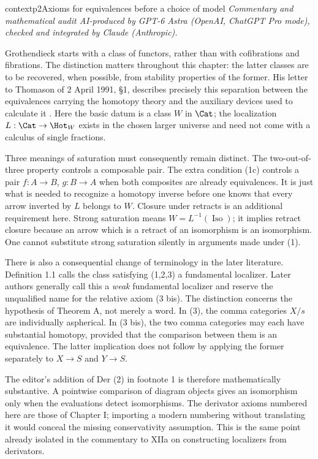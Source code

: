
\begin{dcomment}{context}{p2}{Axioms for equivalences before a choice of model}
\textit{Commentary and mathematical audit AI-produced by GPT-6 Astra (OpenAI, ChatGPT Pro mode), checked and integrated by Claude (Anthropic).}

Grothendieck starts with a class of functors, rather than with cofibrations and fibrations. The distinction matters throughout this chapter: the latter classes are to be recovered, when possible, from stability properties of the former. His letter to Thomason of 2 April 1991, \S1, describes precisely this separation between the equivalences carrying the homotopy theory and the auxiliary devices used to calculate it \citep{Grothendieck1991Letter}. Here the basic datum is a class $W$ in $\Cat$; the localization $L:\Cat\to\Hot_W$ exists in the chosen larger universe and need not come with a calculus of single fractions.

Three meanings of saturation must consequently remain distinct. The two-out-of-three property controls a composable pair. The extra condition (1c) controls a pair $f:A\to B$, $g:B\to A$ when both composites are already equivalences. It is just what is needed to recognize a homotopy inverse before one knows that every arrow inverted by $L$ belongs to $W$. Closure under retracts is an additional requirement here. Strong saturation means $W=L^{-1}(\operatorname{Iso})$; it implies retract closure because an arrow which is a retract of an isomorphism is an isomorphism. One cannot substitute strong saturation silently in arguments made under (1).

There is also a consequential change of terminology in the later literature. Definition 1.1 calls the class satisfying (1,2,3) a fundamental localizer. Later authors generally call this a \emph{weak} fundamental localizer and reserve the unqualified name for the relative axiom (3 bis). The distinction concerns the hypothesis of Theorem A, not merely a word. In (3), the comma categories $X/s$ are individually aspherical. In (3 bis), the two comma categories may each have substantial homotopy, provided that the comparison between them is an equivalence. The latter implication does not follow by applying the former separately to $X\to S$ and $Y\to S$.

The editor's addition of Der (2) in footnote 1 is therefore mathematically substantive. A pointwise comparison of diagram objects gives an isomorphism only when the evaluations detect isomorphisms. The derivator axioms numbered here are those of Chapter I; importing a modern numbering without translating it would conceal the missing conservativity assumption. This is the same point already isolated in the commentary to XIIa on constructing localizers from derivators.
\end{dcomment}

